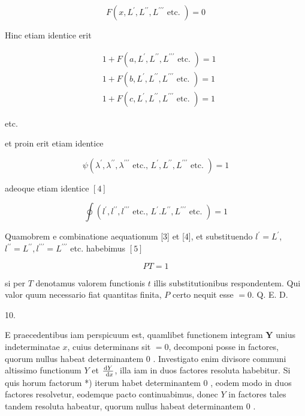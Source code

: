\documentclass[twoside,12pt, showframe]{memoir}
\let\oldfrac\frac
\def\frac#1#2{\mathchoice{\tfrac{#1}{#2}}{\oldfrac{#1}{#2}}{\genfrac{}{}{}{2}{#1}{#2\mathstrut}}{\genfrac{}{}{}{3}{#1}{#2\mathstrut}}}
\begin{document}
\[
F\left(x, L^{\prime}, L^{\prime \prime}, L^{\prime \prime \prime} \text { etc. }\right)=0
\]

Hinc etiam identice erit

\[
\begin{aligned}
& 1+F\left(a, L^{\prime}, L^{\prime \prime}, L^{\prime \prime \prime} \text { etc. }\right)=1 \\
& 1+F\left(b, L^{\prime}, L^{\prime \prime}, L^{\prime \prime \prime} \text { etc. }\right)=1 \\
& 1+F\left(c, L^{\prime}, L^{\prime \prime}, L^{\prime \prime \prime} \text { etc. }\right)=1
\end{aligned}
\]

etc.

et proin erit etiam identice

\[
\psi\left(\lambda^{\prime}, \lambda^{\prime \prime}, \lambda^{\prime \prime \prime} \text { etc., } L^{\prime}, L^{\prime \prime}, L^{\prime \prime \prime} \text { etc. }\right)=1
\]

adeoque etiam identice \([4]\)

\[
\oint\left(l^{\prime}, l^{\prime \prime}, l^{\prime \prime \prime} \text { etc., } L^{\prime} . L^{\prime \prime}, L^{\prime \prime \prime} \text { etc. }\right)=1
\]

Quamobrem e combinatione aequationum [3] et [4], et substituendo \(l^{\prime}=L^{\prime}\), \(l^{\prime \prime}=L^{\prime \prime}, l^{\prime \prime \prime}=L^{\prime \prime \prime}\) etc. habebimus \([5]\)

\[
P T=1
\]

si per \(T\) denotamus valorem functionis \(t\) illis substitutionibus respondentem. Qui valor quum necessario fiat quantitas finita, \(P\) certo nequit esse \(=0\). Q. E. D.

10.

E praecedentibus iam perspicuum est, quamlibet functionem integram \(\boldsymbol{Y}\) unius indeterminatae \(x\), cuius determinans sit \(=0\), decomponi posse in factores, quorum nullus habeat determinantem 0 . Investigato enim divisore communi altissimo functionum \(Y\) et \(\frac{\mathrm{d} Y}{\mathrm{~d} x}\), illa iam in duos factores resoluta habebitur. Si quis horum factorum *) iterum habet determinantem 0 , eodem modo in duos factores resolvetur, eodemque pacto continuabimus, donec \(Y\) in factores tales tandem resoluta habeatur, quorum nullus habeat determinantem 0 .
\end{document}
